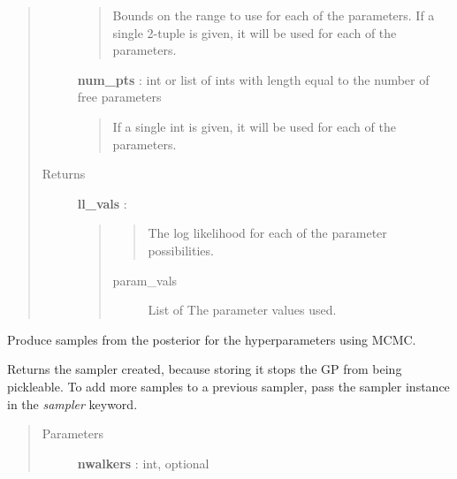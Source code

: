 \documentclass[letterpaper,10pt,english]{sphinxmanual}
\begin{document}
\begin{fulllineitems}
\begin{fulllineitems}
\begin{quote}
\begin{description}
\begin{quote}
Bounds on the range to use for each of the parameters. If a single
2-tuple is given, it will be used for each of the parameters.
\end{quote}

\textbf{num\_pts} : int or list of ints with length equal to the number of free parameters
\begin{quote}

If a single int is given, it will be used for each of the parameters.
\end{quote}

\item[{Returns}] \leavevmode
\textbf{ll\_vals} : 
\begin{quote}
\begin{quote}

The log likelihood for each of the parameter possibilities.
\end{quote}
\begin{description}
\item[{param\_vals}] \leavevmode{[}List of \code{Array}{]}
The parameter values used.

\end{description}
\end{quote}

\end{description}\end{quote}

\end{fulllineitems}


\begin{fulllineitems}
\label{gptools:gptools.gaussian_process.GaussianProcess.sample_hyperparameter_posterior}
Produce samples from the posterior for the hyperparameters using MCMC.

Returns the sampler created, because storing it stops the GP from being
pickleable. To add more samples to a previous sampler, pass the sampler
instance in the \emph{sampler} keyword.
\begin{quote}\begin{description}
\item[{Parameters}] \leavevmode
\textbf{nwalkers} : int, optional
\begin{quote}


\end{quote}
\end{description}
\end{quote}
\end{fulllineitems}
\end{fulllineitems}
\end{document}
